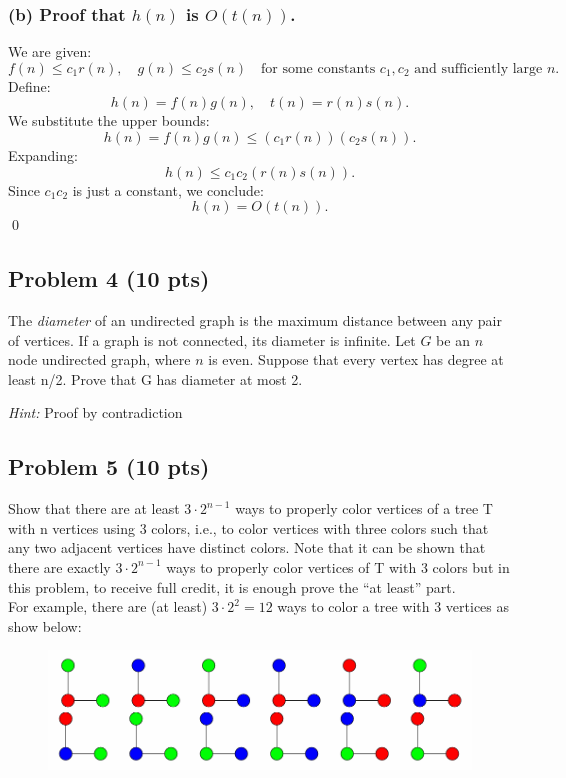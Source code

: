 \documentclass[12pt]{article}
\begin{document}
\subsubsection*{(b) Proof that $h(n)$ is $O(t(n))$.}

We are given:
\[
f(n) \leq c_1 r(n), \quad g(n) \leq c_2 s(n) \quad \text{for some constants } c_1, c_2 \text{ and sufficiently large } n.
\]
Define:
\[
h(n) = f(n) g(n), \quad t(n) = r(n) s(n).
\]
We substitute the upper bounds:
\[
h(n) = f(n) g(n) \leq (c_1 r(n)) (c_2 s(n)).
\]
Expanding:
\[
h(n) \leq c_1 c_2 (r(n) s(n)).
\]
Since \( c_1 c_2 \) is just a constant, we conclude:
\[
h(n) = O(t(n)).
\]
\qed

\subsection*{Problem 4 (10 pts)}
The \textit{diameter} of an undirected graph is the maximum distance between any pair of vertices. If a graph is not connected, its diameter is infinite. Let $G$ be an $n$ node undirected graph, where $n$ is even. Suppose that every vertex has degree at least n/2. Prove that G has diameter at most 2.

\textit{Hint:} Proof by contradiction

\subsection*{Problem 5 (10 pts)}
Show that there are at least $3\cdot2^{n-1}$ ways to properly color vertices of a tree T with n vertices using 3 colors, i.e., to color vertices with three colors such that any two adjacent vertices have  distinct colors. Note that it can be shown that there are exactly $3\cdot2^{n-1}$ ways to properly color vertices of T with 3 colors but in this problem, to receive full credit, it is enough prove the “at least” part.\\
For example, there are (at least) $3\cdot2^2 = 12$ ways to color a tree with 3 vertices as show below:

\begin{figure}[H]
    \centering
    \includegraphics[width=0.8\linewidth]{P5.png}
    \label{fig:3-color-graph}
\end{figure}
\end{document}

